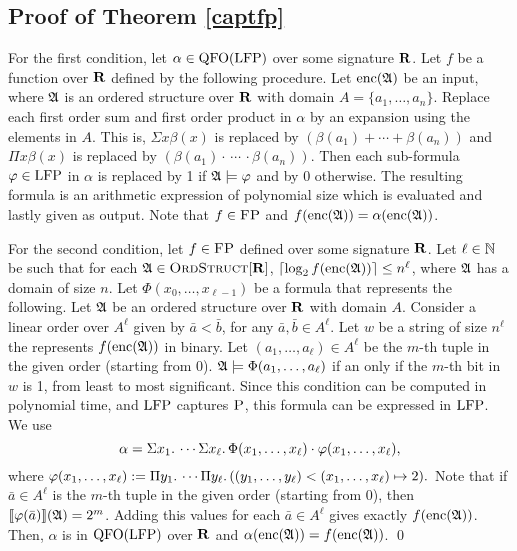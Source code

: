 \subsection{Proof of Theorem \ref{captfp}}


For the first condition, let $\alpha\in{\rm QFO}({\rm LFP})$ over some signature $\mathbf{R}$. Let $f$ be a function over $\mathbf{R}$ defined by the following procedure. Let ${\rm enc}(\mathfrak{A})$ be an input, where $\mathfrak{A}$ is an ordered structure over $\mathbf{R}$ with domain $A = \{a_1,\ldots,a_n\}$. Replace each first order sum and first order product in $\alpha$ by an expansion using the elements in $A$. This is, $\Sigma x \beta(x)$ is replaced by $(\beta(a_1)+\cdots+\beta(a_n))$ and $\Pi x \beta(x)$ is replaced by $(\beta(a_1)\cdot\,\cdots\,\cdot\beta(a_n))$. Then each sub-formula $\varphi\in{\rm LFP}$ in $\alpha$ is replaced by 1 if $\mathfrak{A}\models\varphi$ and by 0 otherwise. The resulting formula is an arithmetic expression of polynomial size which is evaluated and lastly given as output. Note that $f\in\text{\sc FP}$ and $f({\rm enc}(\mathfrak{A})) = \alpha({\rm enc}(\mathfrak{A}))$.
	
For the second condition, let $f\in \text{\sc FP}$ defined over some signature $\mathbf{R}$. Let $\ell\in\mathbb{N}$ be such that for each $\mathfrak{A}\in\text{\sc OrdStruct}[\mathbf{R}]$, $\lceil\log_2 f({\rm enc}(\mathfrak{A})) \rceil \leq n^\ell$, where $\mathfrak{A}$ has a domain of size $n$. Let $\Phi(x_0,\ldots,x_{\ell-1})$ be a formula that represents the following. Let $\mathfrak{A}$ be an ordered structure over $\mathbf{R}$ with domain $A$. Consider a linear order over $A^{\ell}$ given by $\bar{a} < \bar{b}$, for any $\bar{a},\bar{b}\in A^{\ell}$. Let $w$ be a string of size $n^{\ell}$ the represents $f({\rm enc}(\mathfrak{A}))$ in binary. Let $(a_1,\ldots,a_{\ell})\in A^{\ell}$ be the $m$-th tuple in the given order (starting from 0). $\mathfrak{A}\models\Phi(a_1,\ldots,a_{\ell})$ if an only if the $m$-th bit in $w$ is 1, from least to most significant. Since this condition can be computed in polynomial time, and ${\rm LFP}$ captures $\text{\sc P}$, this formula can be expressed in ${\rm LFP}$. We use
$$
\alpha = \Sigma{x_1}.\, \cdots \Sigma{x_{\ell}}.\, \Phi(x_1,\ldots,x_{\ell})\cdot\varphi(x_1,\ldots,x_{\ell}),
$$
where $\varphi(x_1,\ldots,x_{\ell}) := \Pi{y_1}.\,\cdots\Pi{y_{\ell}}.\,((y_1,\ldots,y_{\ell}) < (x_1,\ldots,x_{\ell}) \mapsto 2).$ Note that if $\bar{a} \in A^{\ell}$ is the $m$-th tuple in the given order (starting from 0), then ${\llbracket{}{\varphi(\bar{a})}\rrbracket}(\mathfrak{A}) = 2^{m}$. Adding this values for each $\bar{a}\in A^{\ell}$ gives exactly $f({\rm enc}(\mathfrak{A}))$. Then, $\alpha$ is in ${\rm QFO}({\rm LFP})$ over $\mathbf{R}$ and $\alpha({\rm enc}(\mathfrak{A})) = f({\rm enc}(\mathfrak{A}))$. \qed

